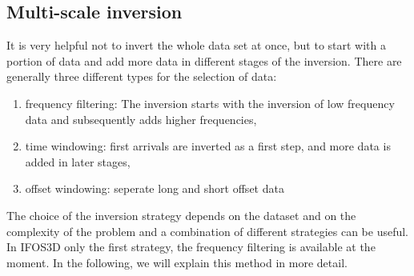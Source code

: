 \subsection{Multi-scale inversion}
It is very helpful not to invert the whole data set at once, but to start with a portion of data and add more data in different stages of the inversion. There are generally three different types for the selection of data:
\begin{enumerate}
 \item frequency filtering: The inversion starts with the inversion of low frequency data and subsequently adds higher frequencies,
 \item time windowing: first arrivals are inverted as a first step, and more data is added in later stages,
 \item offset windowing: seperate long and short offset data
\end{enumerate}
The choice of the inversion strategy depends on the dataset and on the complexity of the problem and a combination of different strategies can be useful. In IFOS3D only the first strategy, the frequency filtering is available at the moment. In the following,
we will explain this method in more detail.
